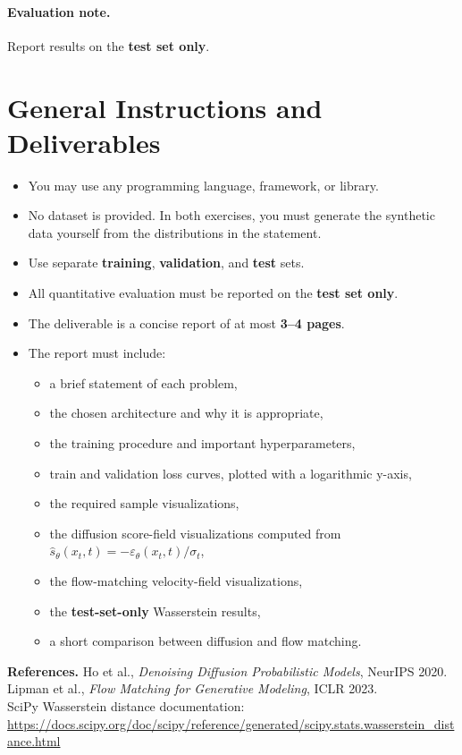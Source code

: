 \documentclass[11pt]{article}
\begin{document}
\paragraph{Evaluation note.}
\aitrap Report results on the \textbf{test set only}.

\section*{General Instructions and Deliverables}
\begin{itemize}
  \item You may use any programming language, framework, or library.
  \item No dataset is provided. In both exercises, you must generate the synthetic data yourself from the distributions in the statement.
  \item Use separate \textbf{training}, \textbf{validation}, and \textbf{test} sets.
  \item All quantitative evaluation must be reported on the \textbf{test set only}.
  \item The deliverable is a concise report of at most \textbf{3--4 pages}.
  \item The report must include:
  \begin{itemize}
    \item a brief statement of each problem,
    \item the chosen architecture and why it is appropriate,
    \item the training procedure and important hyperparameters,
    \item train and validation loss curves, plotted with a logarithmic y-axis,
    \item the required sample visualizations,
    \item the diffusion score-field visualizations computed from $\hat{s}_\theta(x_t,t) = -\varepsilon_\theta(x_t,t)/\sigma_t$,
    \item the flow-matching velocity-field visualizations,
    \item the \textbf{test-set-only} Wasserstein results,
    \item a short comparison between diffusion and flow matching.
  \end{itemize}
\end{itemize}

\vspace{0.75em}
\noindent\textbf{References.}
Ho et al., \emph{Denoising Diffusion Probabilistic Models}, NeurIPS 2020. \\
Lipman et al., \emph{Flow Matching for Generative Modeling}, ICLR 2023. \\
SciPy Wasserstein distance documentation:
\url{https://docs.scipy.org/doc/scipy/reference/generated/scipy.stats.wasserstein_distance.html}
\end{document}
